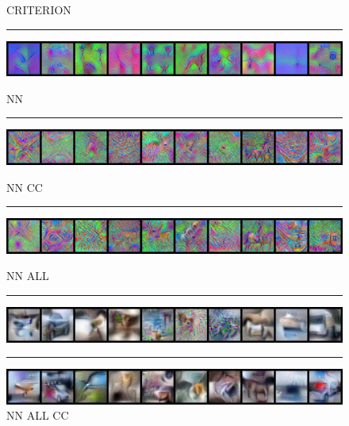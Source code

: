 \begin{figure}[h]
    \centering
    \setlength{\abovecaptionskip}{0pt plus 0pt minus 0pt}
    \setlength{\belowcaptionskip}{10pt plus 0pt minus 0pt}
    
    \caption*{\normalsize{CRITERION}}
    \rule{0.4\textwidth}{.4pt}
    
    \centerline{\hspace*{8mm}\includegraphics[width=1.4\textwidth]{figures/inversion_CIFAR10_CRITERION_epoch_3000.png}}
    \caption*{\normalsize{NN}}
    \rule{0.4\textwidth}{.4pt}
    
    \centerline{\hspace*{8mm}\includegraphics[width=1.4\textwidth]{figures/inversion_CIFAR10_NN_epoch_3000.png}}
    \caption*{\normalsize{NN CC}}
    \rule{0.4\textwidth}{.4pt}
    
    \centerline{\hspace*{8mm}\includegraphics[width=1.4\textwidth]{figures/inversion_CIFAR10_NN_CC_epoch_3000.png}}
    \caption*{\normalsize{NN ALL}}
    \rule{0.4\textwidth}{.4pt}
    
    \centerline{\hspace*{8mm}\includegraphics[width=1.4\textwidth]{figures/inversion_CIFAR10_NN_ALL_epoch_3000.png}}
    \caption*{\normalsize{NN ALL CC}}
    \rule{0.4\textwidth}{.4pt}
    
    \centerline{\hspace*{8mm}\includegraphics[width=1.4\textwidth]{figures/inversion_CIFAR10_NN_ALL_CC_epoch_3000.png}}
\end{figure}

